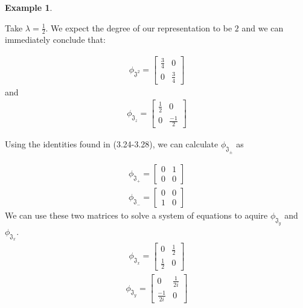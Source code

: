 \documentclass[10pt]{ucthesis}
\newtheorem{example}[definition]{Example}
\begin{document}
\begin{example}\end{example}
	Take $\lambda= \frac{1}{2}$. We expect the degree of our representation to be $2$ and we can immediately conclude that:

\begin{equation}
\begin{aligned}
	\phi_{\mathfrak{J^2}} = \begin{bmatrix}
									\frac{3}{4} & 0 \\
									0 & \frac{3}{4}
								\end{bmatrix}
\end{aligned}
\end{equation}
and 
\begin{equation}
\begin{aligned}
	\phi_{\mathfrak{J}_z} = \begin{bmatrix}
									\frac{1}{2} & 0 \\
									0 & \frac{-1}{2}
								\end{bmatrix}
\end{aligned}
\end{equation}

Using the identities found in (3.24-3.28), we can calculate $\phi_{\mathfrak{J}_\pm}$ as 

\begin{equation}
\begin{aligned}
	\phi_{\mathfrak{J}_+} = \begin{bmatrix}
									0 & 1 \\
									0 & 0
								\end{bmatrix}
\end{aligned}
\end{equation}
\begin{equation}
\begin{aligned}
	\phi_{\mathfrak{J}_-} = \begin{bmatrix}
									0 & 0 \\
									1 & 0
								\end{bmatrix}
\end{aligned}
\end{equation}
We can use these two matrices to solve a system of equations to aquire $\phi_{\mathfrak{J}_y}$ and $\phi_{\mathfrak{J}_x}$.
\begin{equation}
\begin{aligned}
	\phi_{\mathfrak{J}_x} = \begin{bmatrix}
									0 & \frac{1}{2} \\
									\frac{1}{2} & 0
								\end{bmatrix}
\end{aligned}
\end{equation}
\begin{equation}
\begin{aligned}
	\phi_{\mathfrak{J}_y} = \begin{bmatrix}
									0 & \frac{1}{2i} \\
									\frac{-1}{2i} & 0
								\end{bmatrix}
\end{aligned}
\end{equation}
\end{document}
